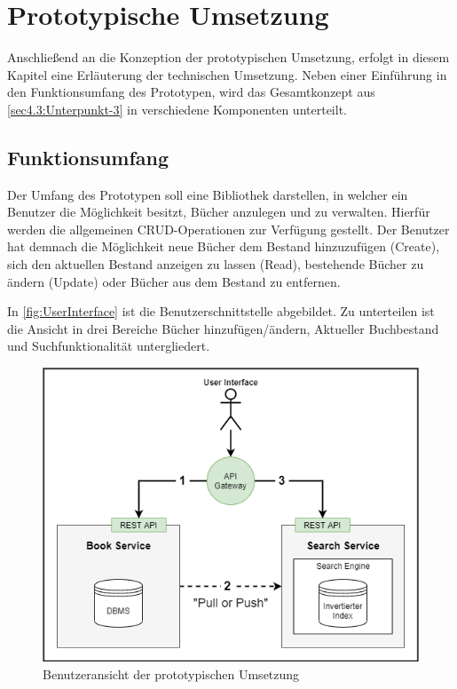 \chapter{Prototypische Umsetzung\label{chap5:Fuenftes-Kapitel}}

Anschließend an die Konzeption der prototypischen Umsetzung, erfolgt in diesem Kapitel eine Erläuterung der technischen Umsetzung. Neben einer Einführung in den Funktionsumfang des Prototypen, wird das Gesamtkonzept aus \autoref{sec4.3:Unterpunkt-3} in verschiedene Komponenten unterteilt.


\section{Funktionsumfang\label{sec5.1:Unterpunkt-1}}

Der Umfang des Prototypen soll eine Bibliothek darstellen, in welcher ein Benutzer die Möglichkeit besitzt, Bücher anzulegen und zu verwalten. Hierfür werden die allgemeinen CRUD-Operationen zur Verfügung gestellt. Der Benutzer hat demnach die Möglichkeit neue Bücher dem Bestand hinzuzufügen (Create), sich den aktuellen Bestand anzeigen zu lassen (Read), bestehende Bücher zu ändern (Update) oder Bücher aus dem Bestand zu entfernen.

In \autoref{fig:UserInterface} ist die Benutzerschnittstelle abgebildet. Zu unterteilen ist die Ansicht in drei Bereiche \glqq Bücher hinzufügen/ändern\grqq{}, \glqq Aktueller Buchbestand\grqq{} und \glqq Suchfunktionalität\grqq{} untergliedert.

\begin{figure}[H]
    \centering
    \includegraphics[width=0.9\linewidth]{images/pullpush_aktualisierung.png}
    \caption{Benutzeransicht der prototypischen Umsetzung}
    \label{fig:UserInterface}
\end{figure}

